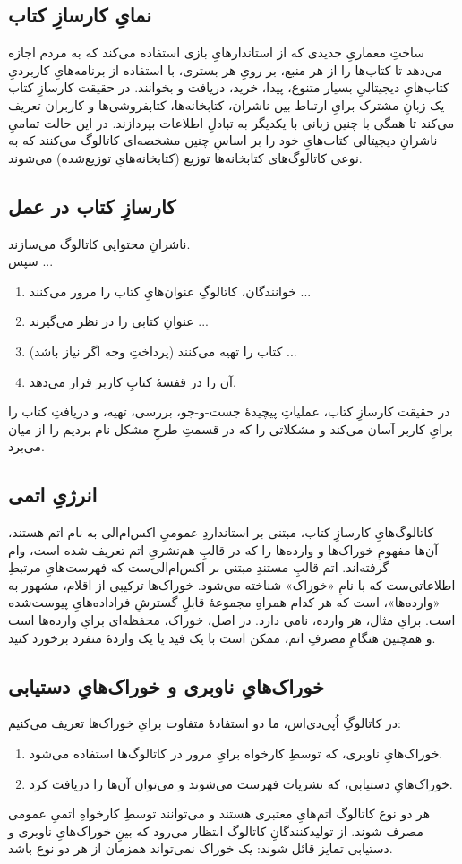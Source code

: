 \documentclass[]{article}
\begin{document}
\subsection{نمایِ کارسازِ کتاب}
ساختِ معماریِ جدیدی که از استاندارهایِ بازی استفاده می‌کند که به مردم اجازه می‌دهد تا کتاب‌ها را از هر منبع، بر رویِ هر بستری، با استفاده از برنامه‌هایِ کاربردیِ کتاب‌هایِ دیجیتالیِ بسیار متنوع، پیدا، خرید، دریافت و بخوانند. در حقیقت کارسازِ کتاب یک زبانِ مشترک برایِ ارتباط بین ناشران، کتابخانه‌ها، کتابفروشی‌ها و کاربران تعریف می‌کند تا همگی با چنین زبانی با یکدیگر به تبادلِ اطلاعات بپردازند. در این حالت تمامیِ ناشرانِ دیجیتالی کتاب‌هایِ خود را بر اساسِ چنین مشخصه‌ای کاتالوگ می‌کنند که به نوعی کاتالوگ‌های کتابخانه‌ها توزیع (کتابخانه‌هایِ توزیع‌شده) می‌شوند.
\subsection{کارسازِ کتاب در عمل}
ناشرانِ محتوایی کاتالوگ می‌سازند.\\
سپس ...\\
\begin{enumerate}
	\item خوانندگان، کاتالوگِ عنوان‌هایِ کتاب را مرور می‌کنند ...
	\item عنوانِ کتابی را در نظر می‌گیرند ...
	\item کتاب را تهیه می‌کنند (پرداختِ وجه اگر نیاز باشد) ...
	\item آن را در قفسهٔ کتابِ کاربر قرار می‌دهد.
\end{enumerate}
در حقیقت کارسازِ کتاب، عملیاتِ پیچیدهٔ جست-و-جو، بررسی، تهیه، و دریافتِ کتاب را برایِ کاربر آسان می‌کند و مشکلاتی را که در قسمتِ طرحِ مشکل نام بردیم را از میان می‌برد.

\subsection{انرژیِ اتمی}
کاتالوگ‌هایِ کارسازِ کتاب، مبتنی بر استانداردِ عمومیِ اکس‌ام‌الی به نام اتم هستند، آن‌ها مفهومِ خوراک‌ها و وارده‌ها را که در قالبِ هم‌نشریِ اتم تعریف شده است، وام گرفته‌اند. اتم قالبِ مستندِ مبتنی-بر-اکس‌ام‌الی‌ست که فهرست‌هایِ مرتبطِ اطلاعاتی‌ست که با نامِ «خوراک» شناخته می‌شود. خوراک‌ها ترکیبی از اقلام، مشهور به «وارده‌ها»، است که هر کدام همراهِ مجموعه‌ٔ قابلِ گسترشِ فراداده‌هایِ پیوست‌شده است. برایِ مثال، هر وارده، نامی دارد. در اصل، خوراک، محفظه‌ای برایِ وارده‌ها است و همچنین هنگامِ مصرفِ اتم، ممکن است با یک فید یا یک واردهٔ منفرد برخورد کنید.
\subsection{خوراک‌هایِ ناوبری و خوراک‌هایِ دستیابی}
در کاتالوگِ اُپی‌دی‌اس، ما دو استفادهٔ متفاوت برایِ خوراک‌ها تعریف می‌کنیم:
\begin{enumerate}
	\item خوراک‌هایِ ناوبری، که توسطِ کارخواه برایِ مرور در کاتالوگ‌ها استفاده می‌شود.
	\item خوراک‌هایِ دستیابی، که نشریات فهرست می‌شوند و می‌توان آن‌ها را دریافت کرد.
\end{enumerate}
هر دو نوع کاتالوگ اتم‌هایِ معتبری هستند و می‌توانند توسطِ کارخواهِ اتمیِ عمومی مصرف شوند. از تولیدکنندگانِ کاتالوگ انتظار می‌رود که بینِ خوراک‌هایِ ناوبری و دستیابی تمایز قائل شوند: یک خوراک نمی‌تواند همزمان از هر دو نوع باشد.
\end{document}
